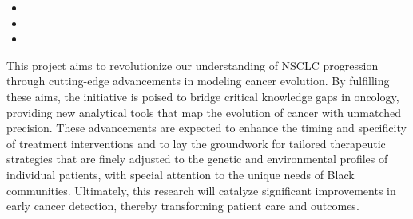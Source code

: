\begin{itemize}[noitemsep]
    \item \SpecificAimThreeA
    \item \SpecificAimThreeB
    \item \SpecificAimThreeC
\end{itemize}

This project aims to revolutionize our understanding of NSCLC progression through cutting-edge advancements in modeling cancer evolution. 
By fulfilling these aims, the initiative is poised to bridge critical knowledge gaps in oncology, 
providing new analytical tools that map the evolution of cancer with unmatched precision. 
These advancements are expected to enhance the timing and specificity of treatment interventions 
and to lay the groundwork for tailored therapeutic strategies that are finely adjusted to the genetic and environmental profiles of individual patients, 
with special attention to the unique needs of Black communities. 
Ultimately, this research will catalyze significant improvements in early cancer detection, thereby transforming patient care and outcomes.




